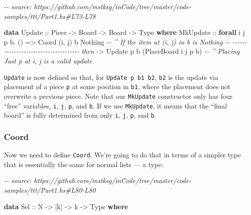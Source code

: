 \documentclass[]{article}
\newenvironment{Shaded}{}{}
\newcommand{\CommentTok}[1]{\textcolor[rgb]{0.38,0.63,0.69}{\textit{#1}}}
\newcommand{\DataTypeTok}[1]{\textcolor[rgb]{0.56,0.13,0.00}{#1}}
\newcommand{\KeywordTok}[1]{\textcolor[rgb]{0.00,0.44,0.13}{\textbf{#1}}}
\newcommand{\NormalTok}[1]{#1}
\newcommand{\OperatorTok}[1]{\textcolor[rgb]{0.40,0.40,0.40}{#1}}
\newcommand{\OtherTok}[1]{\textcolor[rgb]{0.00,0.44,0.13}{#1}}
\begin{document}
\begin{Shaded}
\begin{Highlighting}[]
\CommentTok{{-}{-} source: https://github.com/mstksg/inCode/tree/master/code{-}samples/ttt/Part1.hs\#L73{-}L78}

\KeywordTok{data} \DataTypeTok{Update}\OtherTok{ ::} \DataTypeTok{Piece} \OtherTok{{-}\textgreater{}} \DataTypeTok{Board} \OtherTok{{-}\textgreater{}} \DataTypeTok{Board} \OtherTok{{-}\textgreater{}} \DataTypeTok{Type} \KeywordTok{where}
    \DataTypeTok{MkUpdate}
\OtherTok{        ::} \KeywordTok{forall}\NormalTok{ i j p b}\OperatorTok{.}\NormalTok{ ()}
        \OtherTok{=\textgreater{}} \DataTypeTok{Coord}\NormalTok{ \textquotesingle{}(i, j) b }\DataTypeTok{\textquotesingle{}Nothing}         \CommentTok{{-}{-} \^{} If the item at (i, j) in b is Nothing}
        \CommentTok{{-}{-} {-}{-}{-}{-}{-}{-}{-}{-}{-}{-}{-}{-}{-}{-}{-}{-}{-}{-}{-}{-}{-}{-}{-}{-}{-}{-}{-}{-}{-}{-}{-}{-}{-}{-}{-}{-}{-} then}
        \OtherTok{{-}\textgreater{}} \DataTypeTok{Update}\NormalTok{ p b (}\DataTypeTok{PlaceBoard}\NormalTok{ i j p b)  }\CommentTok{{-}{-} \^{} Placing \textasciigrave{}Just p\textasciigrave{} at i, j is a valid update}
\end{Highlighting}
\end{Shaded}

\texttt{Update} is now defined so that, for \texttt{Update\ p\ b1\ b2},
\texttt{b2} is the update via placement of a piece \texttt{p} at some position
in \texttt{b1}, where the placement does not overwrite a previous piece. Note
that our \texttt{MkUpdate} constructor only has four ``free'' variables,
\texttt{i}, \texttt{j}, \texttt{p}, and \texttt{b}. If we use \texttt{MkUpdate},
it means that the ``final board'' is fully determined from only \texttt{i},
\texttt{j}, \texttt{p}, and \texttt{b}.

\subsubsection{Coord}\label{coord}

Now we need to define \texttt{Coord}. We're going to do that in terms of a
simpler type that is essentially the same for normal lists --- a type:

\begin{Shaded}
\begin{Highlighting}[]
\CommentTok{{-}{-} source: https://github.com/mstksg/inCode/tree/master/code{-}samples/ttt/Part1.hs\#L80{-}L80}

\KeywordTok{data} \DataTypeTok{Sel}\OtherTok{ ::} \DataTypeTok{N} \OtherTok{{-}\textgreater{}}\NormalTok{ [k] }\OtherTok{{-}\textgreater{}}\NormalTok{ k }\OtherTok{{-}\textgreater{}} \DataTypeTok{Type} \KeywordTok{where}
\end{Highlighting}
\end{Shaded}
\end{document}
